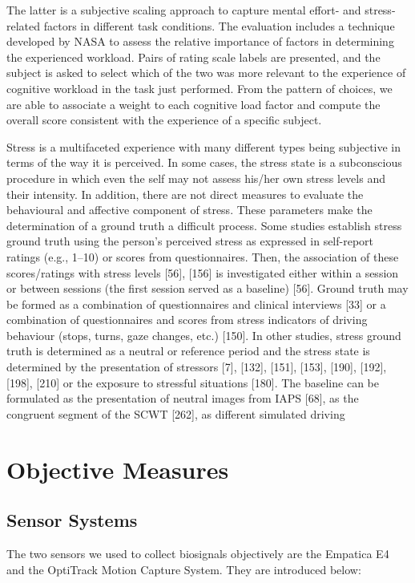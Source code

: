 The latter is a subjective scaling
approach to capture mental effort- and stress-related factors in different
task conditions. The evaluation includes a technique developed by
NASA to assess the relative importance of factors in determining the
experienced workload. Pairs of rating scale labels are presented, and
the subject is asked to select which of the two was more relevant
to the experience of cognitive workload in the task just performed.
From the pattern of choices, we are able to associate a weight to each
cognitive load factor and compute the overall score consistent with the
experience of a specific subject. 

Stress is a multifaceted experience with many different types being subjective in terms of the way it is perceived. In some cases, the stress state is a subconscious procedure in which even the self may not assess his/her own stress levels and their intensity. In addition, there are not direct measures to evaluate the behavioural and affective component of stress. These parameters make the determination of a ground truth a difficult process. Some studies establish stress ground truth using the person’s perceived stress as expressed in self-report ratings (e.g., 1–10) or scores from questionnaires. Then, the association of
these scores/ratings with stress levels [56], [156] is investigated either within a session or between sessions (the first session served as a baseline) [56]. Ground truth may be formed as a combination of questionnaires and clinical interviews [33] or a combination of questionnaires and scores from stress indicators of driving behaviour (stops, turns, gaze changes, etc.) [150]. In other studies, stress ground truth is determined as a neutral or reference period and the stress state is determined by the presentation of stressors [7], [132], [151], [153], [190], [192], [198], [210] or the exposure to stressful situations [180]. The baseline can be formulated as the presentation of neutral images from IAPS [68], as the congruent segment of the SCWT [262], as different simulated driving



\section{Objective Measures}
\subsection{Sensor Systems}
The two sensors we used to collect biosignals objectively are the Empatica E4 and the OptiTrack Motion Capture System. They are introduced below:
